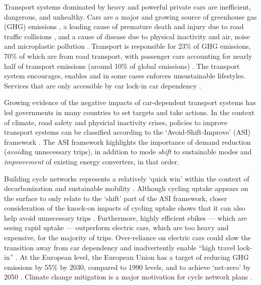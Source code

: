\documentclass[
  super,
  preprint,
  3p]{elsarticle}
\begin{document}
Transport systems dominated by heavy and powerful private cars are
inefficient, dangerous, and unhealthy. Cars are a major and growing
source of greenhouse gas (GHG) emissions \citep{winkler2023}, a leading
cause of premature death and injury due to road traffic collisions
\citep{globals2018}, and a cause of disease due to physical inactivity
and air, noise and microplastic pollution \citep{mattsson2023}
\citep{welch2023} \citep{cavallaro2024}. Transport is responsible for
23\% of GHG emissions, 70\% of which are from road transport, with
passenger cars accounting for nearly half of transport emissions (around
10\% of global emissions) \citep{jaramillo2022}. The transport system
encourages, enables and in some cases enforces unsustainable lifestyles.
Services that are only accessible by car lock-in car dependency
\citep{gray2001, shergold2012, motte-baumvol2010}.

Growing evidence of the negative impacts of car-dependent transport
systems has led governments in many countries to set targets and take
actions. In the context of climate, road safety and physicial inactivity
crises, policies to improve transport systems can be classified
according to the `Avoid-Shift-Improve' (ASI) framework
\citep{jaramillo2022}. The ASI framework highlights the importance of
demand reduction (\emph{avoid}ing unnecessary trips), in addition to
mode \emph{shift} to sustainable modes and \emph{improvement} of
existing energy converters, in that order.

Building cycle networks represents a relatively `quick win' within the
context of decarbonization \citep{brand2020} and sustainable mobility
\citep{burns2013}. Although cycling uptake appears on the surface to
only relate to the `shift' part of the ASI framework, closer
consideration of the knock-on impacts of cycling uptake shows that it
can also help avoid unnecessary trips \citep{nello-deakin2020}.
Furthermore, highly efficient ebikes --- which are seeing rapid uptake
--- outperform electric cars, which are too heavy and expensive, for the
majority of trips. Over-reliance on electric cars could slow the
transition away from car dependency and inadvertently enable ``high
travel lock-in'' \citep{anable2019}. At the European level, the European
Union has a target of reducing GHG emissions by 55\% by 2030, compared
to 1990 levels, and to achieve `net-zero' by 2050 \citep{rosenow2022}.
Climate change mitigation is a major motivation for cycle network plans
\citep{scappini2022}.
\end{document}
